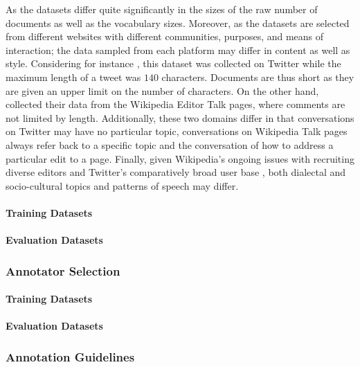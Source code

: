 As the datasets differ quite significantly in the sizes of the raw number of documents as well as the vocabulary sizes. Moreover, as the datasets are selected from different websites with different communities, purposes, and means of interaction; the data sampled from each platform may differ in content as well as style. Considering for instance \citet{Waseem:2016}, this dataset was collected on Twitter while the maximum length of a tweet was $140$ characters. Documents are thus short as they are given an upper limit on the number of characters. On the other hand, \citet{Wulczyn:2017} collected their data from the Wikipedia Editor Talk pages, where comments are not limited by length. Additionally, these two domains differ in that conversations on Twitter may have no particular topic, conversations on Wikipedia Talk pages always refer back to a specific topic and the conversation of how to address a particular edit to a page. Finally, given Wikipedia's ongoing issues with recruiting diverse editors \cite{CITE: Wikipedia editors issue} and Twitter's comparatively broad user base \cite{CITE: Twitter userbase by demographic ref}, both dialectal and socio-cultural topics and patterns of speech may differ. 

\paragraph{Training Datasets}

\paragraph{Evaluation Datasets}

\subsubsection{Annotator Selection}

\paragraph{Training Datasets}

\paragraph{Evaluation Datasets}

\subsubsection{Annotation Guidelines}

